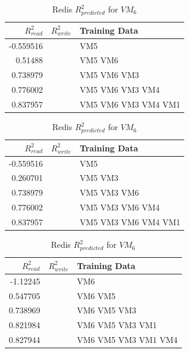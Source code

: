 \documentclass{acm_proc_article-sp}
\begin{document}
\begin{table}
\centering
\caption{Redis $R_{predicted}^2$ for $VM_6$}
\begin{tabular}{|r|r|l|} \hline
$R_{read}^2$&$R_{write}^2$&Training Data\\ \hline
-0.559516 &   & VM5 \\ \hline 
0.51488 &   & VM5 VM6 \\ \hline 
0.738979 &   & VM5 VM6 VM3 \\ \hline 
0.776002 &   & VM5 VM6 VM3 VM4 \\ \hline 
0.837957 &   & VM5 VM6 VM3 VM4 VM1 \\ \hline 
\hline\end{tabular}
\label{table:redis}
\end{table}

\begin{table}
\centering
\caption{Redis $R_{predicted}^2$ for $VM_6$}
\begin{tabular}{|r|r|l|} \hline
$R_{read}^2$&$R_{write}^2$&Training Data\\ \hline
-0.559516 &   & VM5 \\ \hline 
0.260701 &   & VM5 VM3 \\ \hline 
0.738979 &   & VM5 VM3 VM6 \\ \hline 
0.776002 &   & VM5 VM3 VM6 VM4 \\ \hline 
0.837957 &   & VM5 VM3 VM6 VM4 VM1 \\ \hline 
\hline\end{tabular}
\label{table:redis}
\end{table}










\begin{table}
\centering
\caption{Redis $R_{predicted}^2$ for $VM_6$}
\begin{tabular}{|r|r|l|} \hline
$R_{read}^2$&$R_{write}^2$&Training Data\\ \hline
-1.12245 &   & VM6 \\ \hline 
0.547705 &   & VM6 VM5 \\ \hline 
0.738969 &   & VM6 VM5 VM3 \\ \hline 
0.821984 &   & VM6 VM5 VM3 VM1 \\ \hline 
0.827944 &   & VM6 VM5 VM3 VM1 VM4 \\ \hline 
\hline\end{tabular}
\label{table:redis}
\end{table}
\end{document}
